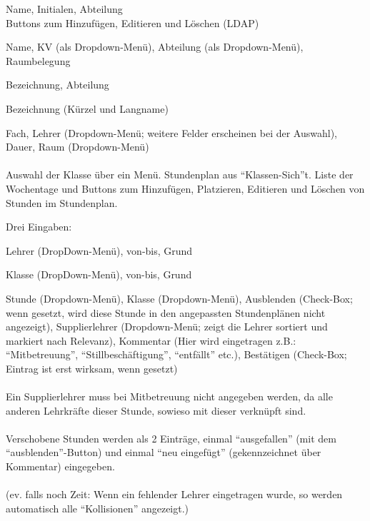 \begin{description}[style=nextline]
	\item[Lehrer]
		Name, Initialen, Abteilung\\
		Buttons zum Hinzufügen, Editieren und Löschen (LDAP)
	\item[Klassen]
		Name, KV (als Dropdown-Menü), Abteilung (als Dropdown-Menü), Raumbelegung
	\item[Räume]
		Bezeichnung, Abteilung
	\item[Fächer]
		Bezeichnung (Kürzel und Langname)
	\item[Stunden(-pläne)]
		Fach, Lehrer (Dropdown-Menü; weitere Felder erscheinen bei der Auswahl), Dauer, Raum (Dropdown-Menü)\\
		\\
		Auswahl der Klasse über ein Menü. Stundenplan aus \enquote{Klassen-­Sich}t. Liste der Wochentage und Buttons zum Hinzufügen, Platzieren, Editieren und Löschen von Stunden im Stundenplan.
	\item[Supplierungen]
		Drei Eingaben:
		\begin{description}[style=nextline]
			\item[fehlende Lehrer]
				Lehrer (DropDown-Menü), von-bis, Grund
			\item[fehlende Klassen]
				Klasse (DropDown-Menü), von-bis, Grund
			\item[Supplierungen]
				Stunde (Dropdown­-Menü), Klasse (Dropdown-Menü), Ausblenden (Check-Box; wenn gesetzt, wird diese Stunde in den angepassten Stundenplänen nicht angezeigt), Supplierlehrer (Dropdown-Menü; zeigt die Lehrer sortiert und markiert nach Relevanz), Kommentar (Hier wird eingetragen z.B.: \enquote{Mitbetreuung}, \enquote{Stillbeschäftigung}, \enquote{entfällt} etc.), Bestätigen (Check-Box; Eintrag ist erst wirksam, wenn gesetzt)\\
			\\
			Ein Supplierlehrer muss bei Mitbetreuung nicht angegeben werden, da alle anderen Lehrkräfte dieser Stunde, sowieso mit dieser verknüpft sind.\\
			\\
			Verschobene Stunden werden als 2 Einträge, einmal \enquote{ausgefallen} (mit dem \enquote{ausblenden}-­Button) und einmal \enquote{neu eingefügt} (gekennzeichnet über Kommentar) eingegeben.\\
			\\
			(ev. falls noch Zeit: Wenn ein fehlender Lehrer eingetragen wurde, so werden automatisch alle \enquote{Kollisionen} angezeigt.)

\end{description}
\end{description}
